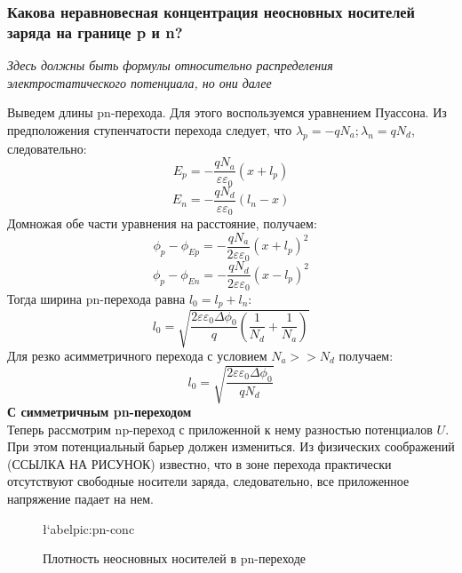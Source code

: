 \subsubsection{Какова неравновесная концентрация неосновных носителей заряда на границе p и n?}
\textit{Здесь должны быть формулы относительно распределения электростатического потенциала, но они далее}

Выведем длины pn-перехода. Для этого воспользуемся уравнением Пуассона. Из предположения ступенчатости перехода следует, что $\lambda_p = - q N_a; \lambda_n = q N_d$, следовательно:
\begin{equation}
E_p = -  \frac{q N_a}{\varepsilon \varepsilon_0} (x + l_p)
\end{equation}
\begin{equation}
E_n = -  \frac{q N_d}{\varepsilon \varepsilon_0} (l_n - x)
\end{equation}
Домножая обе части уравнения на расстояние, получаем:
\begin{equation}
\phi_p - \phi_{Ep} =  -  \frac{q N_a}{2 \varepsilon \varepsilon_0} (x + l_p)^2
\end{equation}
\begin{equation}
\phi_p - \phi_{En} =  -  \frac{q N_d}{2 \varepsilon \varepsilon_0} (x - l_p)^2
\end{equation}
Тогда ширина pn-перехода равна $l_0 = l_p + l_n$:
\begin{equation}
l_0  = \sqrt{\frac{2 \varepsilon \varepsilon_0 \Delta \phi_0}{q} (\frac{1}{N_d}+ \frac{1}{N_a})}
\end{equation}
Для резко асимметричного перехода с условием $N_a >> N_d$ получаем:
\begin{equation}
l_0  = \sqrt{\frac{2 \varepsilon \varepsilon_0 \Delta \phi_0}{q N_d} }
\end{equation}
\textbf{С симметричным pn-переходом}\\
Теперь рассмотрим np-переход с приложенной к нему разностью потенциалов $U$.
При этом потенциальный барьер должен измениться. Из физических соображений (ССЫЛКА НА РИСУНОК) известно, что в зоне перехода практически отсутствуют свободные носители заряда, следовательно, все приложенное напряжение падает на нем.


\begin{center}
	\begin{figure}[h!]
		\caption{Плотность неосновных носителей в pn-переходе}	
		\l`abel{pic:pn-conc}
	\end{figure}
\end{center}


